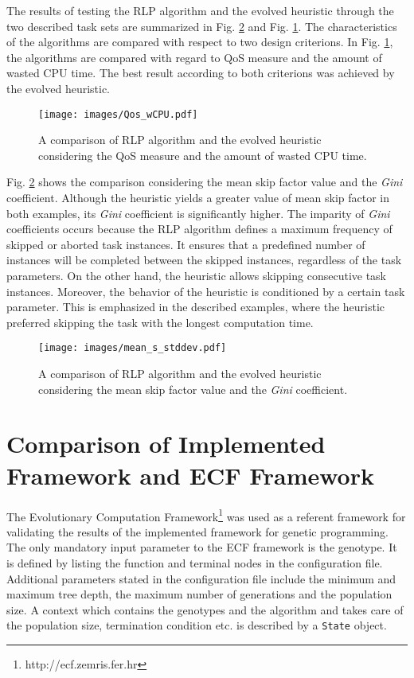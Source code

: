 The results of testing the RLP algorithm and the evolved heuristic through the two described task sets are summarized in Fig. \ref{cmp2} and Fig. \ref{cmp1}.
The characteristics of the algorithms are compared with respect to two design criterions. 
In Fig. \ref{cmp1}, the algorithms are compared with regard to QoS measure and the amount of wasted CPU time. The best result according to both criterions was achieved by the evolved heuristic. 
\begin{figure}[H]
    \centering
    \texttt{[image: images/Qos\_wCPU.pdf]}
    \caption{A comparison of RLP algorithm and the evolved heuristic considering the QoS measure and the amount of wasted CPU time.}
    \label{cmp1}
\end{figure}

Fig. \ref{cmp2} shows the comparison considering the mean skip factor value and the \textit{Gini} coefficient. 
Although the heuristic yields a greater value of mean skip factor in both examples, its \textit{Gini} coefficient is significantly higher.
The imparity of \textit{Gini} coefficients occurs because the RLP algorithm defines a maximum frequency of skipped or aborted task instances.
It ensures that a predefined number of instances will be completed between the skipped instances, regardless of the task parameters.
On the other hand, the heuristic allows skipping consecutive task instances.
Moreover, the behavior of the heuristic is conditioned by a certain task parameter.
This is emphasized in the described examples, where the heuristic preferred skipping the task with the longest computation time.
\begin{figure}[H]
    \centering
    \texttt{[image: images/mean\_s\_stddev.pdf]}
    \caption{A comparison of RLP algorithm and the evolved heuristic considering the mean skip factor value and the \textit{Gini} coefficient.}
    \label{cmp2}
\end{figure}

\section{Comparison of Implemented Framework and ECF Framework}
The Evolutionary Computation Framework\footnote{http://ecf.zemris.fer.hr} was used as a referent framework for validating the results of the implemented framework for genetic programming.
The only mandatory input parameter to the ECF framework is the genotype.
It is defined by listing the function and terminal nodes in the configuration file.
Additional parameters stated in the configuration file include the minimum and maximum tree depth, the maximum number of generations and the population size.
A context which contains the genotypes and the algorithm and takes care of the population size, termination condition etc. is described by a \texttt{State} object.

